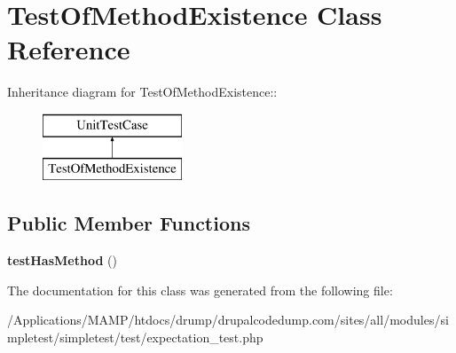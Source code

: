 \hypertarget{class_test_of_method_existence}{
\section{TestOfMethodExistence Class Reference}
\label{class_test_of_method_existence}
}
Inheritance diagram for TestOfMethodExistence::\begin{figure}[H]
\begin{center}
\leavevmode
\includegraphics[height=2cm]{class_test_of_method_existence}
\end{center}
\end{figure}
\subsection*{Public Member Functions}
\begin{DoxyCompactItemize}
\item 
\hypertarget{class_test_of_method_existence_af2a912284573ea2c0c736e34727abfb6}{
{\bfseries testHasMethod} ()}
\label{class_test_of_method_existence_af2a912284573ea2c0c736e34727abfb6}

\end{DoxyCompactItemize}


The documentation for this class was generated from the following file:\begin{DoxyCompactItemize}
\item 
/Applications/MAMP/htdocs/drump/drupalcodedump.com/sites/all/modules/simpletest/simpletest/test/expectation\_\-test.php\end{DoxyCompactItemize}
